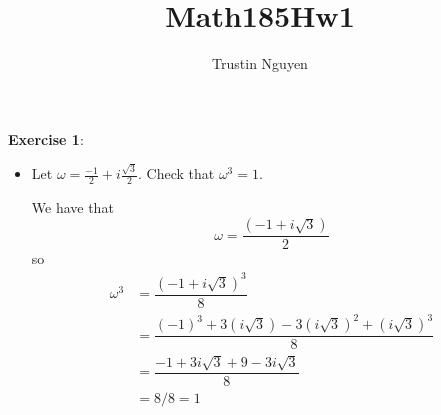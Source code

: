 \documentclass{article}
\title{Math185Hw1}
\author{Trustin Nguyen}
\begin{document}
    \maketitle

\reversemarginpar


\textbf{Exercise 1}:
    \begin{itemize}
        \item Let $\omega = \frac{-1}{2} + i \frac{\sqrt{3}}{2}$. Check that $\omega^{3} = 1$.
            \begin{answer}
                We have that 
                    \begin{equation*}
                        \omega = \dfrac{(-1 + i \sqrt{3})}{2}
                    \end{equation*}
                so
                    \begin{align*}
                        \omega^{3} &= \dfrac{(-1 + i\sqrt{3})^{3}}{8} \\
                                   &= \dfrac{(-1)^{3} + 3(i \sqrt{3}) - 3(i \sqrt{3})^{2} + (i \sqrt{3})^{3}}{8} \\
                                   &= \dfrac{-1 + 3i\sqrt{3} + 9 - 3i\sqrt{3}}{8} \\
                                   &= 8/8 = 1
                    \end{align*}
            \end{answer}


\end{itemize}
\end{document}

